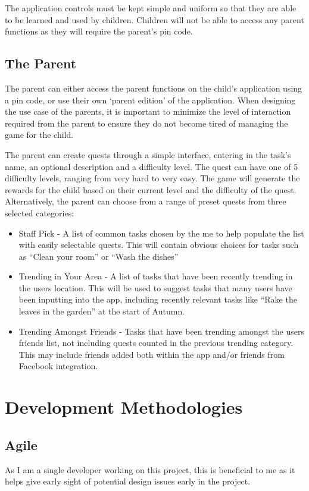 The application controls must be kept simple and uniform so that they are able to be learned and used by children.
Children will not be able to access any parent functions as they will require the parent's pin code. 

\subsection{The Parent}
The parent can either access the parent functions on the child's application using a pin code, or use their own `parent edition' of the application. 
When designing the use case of the parents, it is important to minimize the level of interaction required from the parent to ensure they do not become tired of managing the game for the child.

The parent can create quests through a simple interface, entering in the task's name, an optional description and a difficulty level. 
The quest can have one of 5 difficulty levels, ranging from very hard to very easy.
The game will generate the rewards for the child based on their current level and the difficulty of the quest.
Alternatively, the parent can choose from a range of preset quests from three selected categories:
\begin{itemize}
	\item 
		Staff Pick - A list of common tasks chosen by the me to help populate the list with easily selectable quests. 
		This will contain obvious choices for tasks such as ``Clean your room'' or ``Wash the dishes''
	\item
		Trending in Your Area - A list of tasks that have been recently trending in the users location. 
		This will be used to suggest tasks that many users have been inputting into the app, including recently relevant tasks like ``Rake the leaves in the garden'' at the start of Autumn.
	\item 
		Trending Amongst Friends - Tasks that have been trending amongst the users friends list, not including quests counted in the previous 	trending category. 
		This may include friends added both within the app and/or friends from Facebook integration.  
\end{itemize}

\section{Development Methodologies}
\subsection{Agile}
As I am a single developer working on this project, this is beneficial to me as it helps give early sight of potential design issues early in the project.

